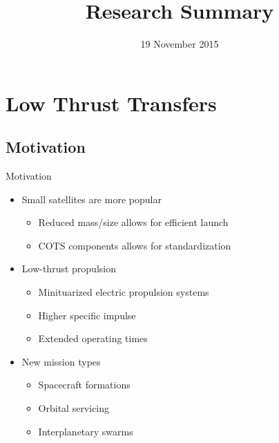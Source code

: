 \documentclass[11pt,professionalfonts]{beamer}
\title[Research Summary]{\large\bf  Research Summary}
\author{\vspace*{-0.3cm}}
\date{19 November 2015}
\institute{
	\footnotesize
	{\normalsize\bf{Shankar Kulumani}}\\
	Ph.D. student\\
	\vspace*{0.2cm}
  	\bf{Department of Mechanical \& Aerospace Engineering}\\ \vspace*{0.5cm}
 	\begin{figure} %
       	\texttt{[image: gw\_txh\_2cs\_pos]}
  	\end{figure}
}
\begin{document}

\setcounter{framenumber}{-1}
\begin{frame} %
  \titlepage
\end{frame}   %

\section{Low Thrust Transfers}
\subsection{Motivation}

\begin{frame}{Motivation} %
	\begin{itemize}
		\item Small satellites are more popular
		\begin{itemize}
			\item Reduced mass/size allows for efficient launch
			\item COTS components allows for standardization
		\end{itemize}
		\pause
		\item Low-thrust propulsion
		\begin{itemize}
			\item Minituarized electric propulsion systems
			\item Higher specific impulse
			\item Extended operating times 
		\end{itemize}
		\pause
		\item New mission types
		\begin{itemize}
			\item Spacecraft formations
			\item Orbital servicing
			\item Interplanetary swarms
		\end{itemize}
	\end{itemize}
	
\end{frame} %
\end{document}
